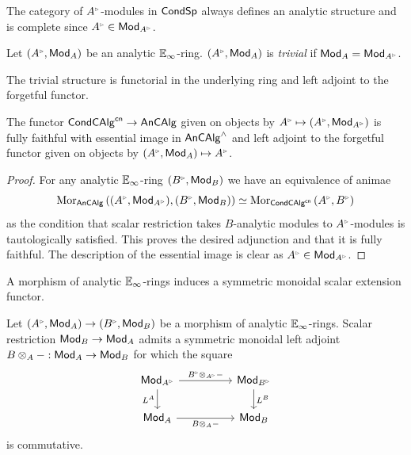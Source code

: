 The category of $A^{\tri}$-modules in $\mathsf{Cond}\mathsf{Sp}$ always defines an analytic structure and is complete since $A^{\tri}\in\Mod_{A^{\tri}}$.
\begin{definition}\label{def: trivial analytic ring structure}
    Let $(A^{\tri},\Mod_{A})$ be an analytic $\mathbb{E}_{\infty}$-ring. $(A^{\tri},\Mod_{A})$ is \emph{trivial} if $\Mod_{A}=\Mod_{A^{\tri}}$. 
\end{definition}
The trivial structure is functorial in the underlying ring and left adjoint to the forgetful functor.
\begin{proposition}\label{prop: trivial is left adjoint}
    The functor $\mathsf{Cond}\mathsf{CAlg}^{\mathsf{cn}}\to\mathsf{An}\mathsf{CAlg}$ given on objects by $A^{\tri}\mapsto(A^{\tri},\Mod_{A^{\tri}})$ is fully faithful with essential image in $\mathsf{An}\mathsf{CAlg}^{\wedge}$ and left adjoint to the forgetful functor given on objects by $(A^{\tri},\Mod_{A})\mapsto A^{\tri}$. 
\end{proposition}
\begin{proof}
    For any analytic $\mathbb{E}_{\infty}$-ring $(B^{\tri},\Mod_{B})$ we have an equivalence of animae 
    $$\Mor_{\An\CAlg}\left((A^{\tri},\Mod_{A^{\tri}}),(B^{\tri},\Mod_{B})\right)\simeq\Mor_{\Cond\CAlg^{\cn}}\left(A^{\tri},B^{\tri}\right)$$
    as the condition that scalar restriction takes $B$-analytic modules to $A^{\tri}$-modules is tautologically satisfied. This proves the desired adjunction and that it is fully faithful. The description of the essential image is clear as $A^{\tri}\in\Mod_{A^{\tri}}$. 
\end{proof}
A morphism of analytic $\mathbb{E}_{\infty}$-rings induces a symmetric monoidal scalar extension functor. 
\begin{proposition}\label{prop: scalar extension functor is symmetric monoidal}
    Let $(A^{\tri},\Mod_{A})\to(B^{\tri},\Mod_{B})$ be a morphism of analytic $\mathbb{E}_{\infty}$-rings. Scalar restriction $\mathsf{Mod}_{B}\to\mathsf{Mod}_{A}$ admits a symmetric monoidal left adjoint $B\otimes_{A}-:\mathsf{Mod}_{A}\to\mathsf{Mod}_{B}$ for which the square
    \begin{equation}\label{eqn: scalar extension is sym mon}
        \begin{tikzcd}
            {\Mod_{A^{\tri}}} && {\Mod_{B^{\tri}}} \\
            {\Mod_{A}} && {\Mod_{B}}
            \arrow["{B^{\tri}\otimes_{A^{\tri}}-}", from=1-1, to=1-3]
            \arrow["{L^{A}}"', from=1-1, to=2-1]
            \arrow["{L^{B}}", from=1-3, to=2-3]
            \arrow["{B\otimes_{A}-}"', from=2-1, to=2-3]
        \end{tikzcd}
    \end{equation}
    is commutative. 
\end{proposition}

